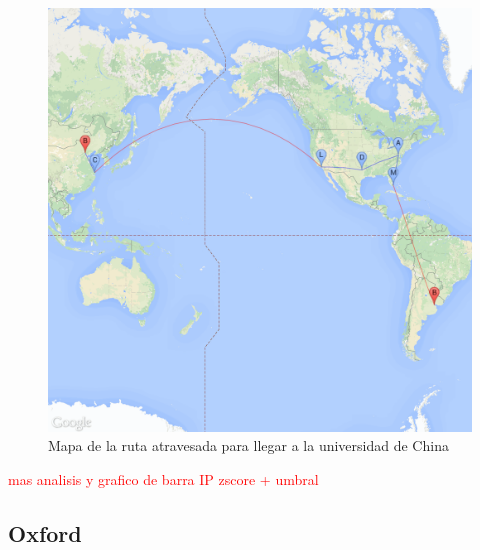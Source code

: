 ~

\begin{figure}[H]
	\begin{center}
		  \includegraphics[scale=0.25]{../results/maps/Tsinghua.png}
		  \caption{Mapa de la ruta atravesada para llegar a la universidad de China}
	\end{center}
\end{figure}

\textcolor{red}{mas analisis y grafico de barra IP zscore + umbral}

\subsection{Oxford}

~

